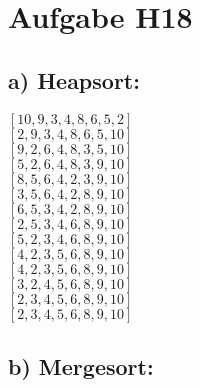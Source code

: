 \documentclass[a4paper,graphics,14pt]{article}
\newcommand{\aufgabe}[1]{\section*{Aufgabe #1}}
\newcommand{\apt}[1]{\subsection*{#1:} }
\begin{document}
\aufgabe{H18}
\doublespacing
\apt{a) Heapsort}

$[10,9,3,4,8,6,5,2]$ \\
$[2,9,3,4,8,6,5,10]$ \\
$[9,2,6,4,8,3,5,10]$ \\
$[5,2,6,4,8,3,9,10]$ \\
$[8,5,6,4,2,3,9,10]$ \\
$[3,5,6,4,2,8,9,10]$ \\
$[6,5,3,4,2,8,9,10]$ \\
$[2,5,3,4,6,8,9,10]$ \\
$[5,2,3,4,6,8,9,10]$ \\
$[4,2,3,5,6,8,9,10]$ \\
$[4,2,3,5,6,8,9,10]$ \\
$[3,2,4,5,6,8,9,10]$ \\
$[2,3,4,5,6,8,9,10]$ \\
$[2,3,4,5,6,8,9,10]$ \\

\apt{b) Mergesort}

\begin{center}

 \\

 \hspace{0,6cm}  \\

 \hspace{0,4cm}  \hspace{0,4cm}  \hspace{0,4cm}  \\

 \hspace{0,2cm}  \hspace{0,2cm}  \hspace{0,2cm}  \hspace{0,2cm}  \hspace{0,2cm}  \hspace{0,2cm}  \hspace{0,2cm}  \\

 \hspace{0,4cm}  \hspace{0,4cm}  \hspace{0,4cm}  \\

 \hspace{0,6cm}  \\

 \\
\end{center} 
\end{document}
